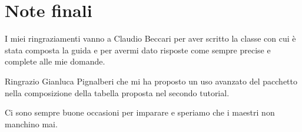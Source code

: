 

\chapter{Note finali}

I miei ringraziamenti vanno a Claudio Beccari per aver scritto la classe
 con cui è stata composta la guida e per avermi dato
risposte come sempre precise e complete alle mie domande.

Ringrazio Gianluca Pignalberi che mi ha proposto un uso avanzato del pacchetto
 nella composizione della tabella proposta nel secondo tutorial.

Ci sono sempre buone occasioni per imparare e speriamo che i maestri non
manchino mai.

